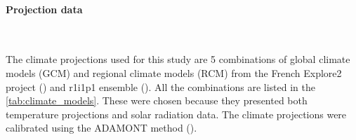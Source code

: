 \documentclass[11pt]{article}
\begin{document}
            

        \paragraph{Projection data}\mbox{}\\ %
        \label{par:proj_data}

        The climate projections used for this study are 5 combinations of global climate models (GCM) and regional climate models (RCM) from the French Explore2 project (\cite{sauquet_explore2_2021}) and r1i1p1 ensemble (\cite{taylor_cmip5_2010}). All the combinations are listed in the \ref{tab:climate_models}. These were chosen because they presented both temperature projections and solar radiation data. The climate projections were calibrated using the ADAMONT method (\cite{verfaillie_method_2017}).\\
\end{document}
